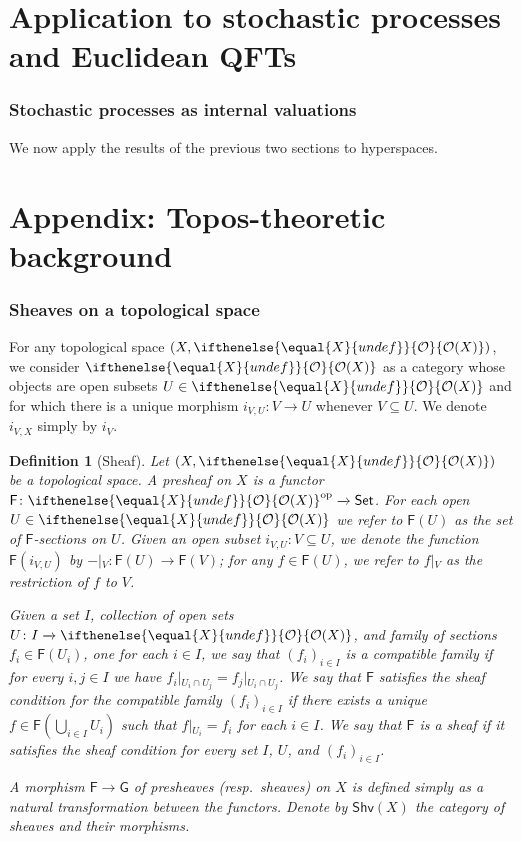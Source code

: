 \documentclass[reqno,11pt]{amsproc}
\theoremstyle{plain}
\newtheorem{definition}[theorem]{Definition}
\theoremstyle{definition}
\newcommand{\cat}[1]{\mathsf{#1}}
\newcommand{\fun}[1]{\mathsf{#1}}
\newcommand{\sheaf}[1]{\fun{#1}}
\newcommand{\op}{^\mathrm{op}}
\newcommand{\Set}{\cat{Set}}
\renewcommand{\to}[1][]{\xrightarrow{#1}}
\newcommand{\shv}{\cat{Shv}}
\newcommand{\Op}[1][undef]{\ifthenelse{\equal{#1}{undef}}{\mathcal{O}}{\mathcal{O}(#1)}}
\newcommand{\rest}[2]{#1\big|\hspace{0in}_{#2}}
\numberwithin{equation}{section}
\begin{document}
\newpage
\part{Application to stochastic processes and Euclidean QFTs}

\section{Stochastic processes as internal valuations}

We now apply the results of the previous two sections to hyperspaces.



\appendix
\part{Appendix: Topos-theoretic background}\label{sec.topos_background}

\section{Sheaves on a topological space}

For any topological space $(X,\Op[X])$, we consider $\Op[X]$ as a category whose objects are open subsets $U\in\Op[X]$ and for which there is a unique morphism $i_{V,U}\colon V\to U$ whenever $V\subseteq U$. We denote $i_{V,X}$ simply by $i_V$.

\begin{definition}[Sheaf]\label{def.sheaf}
Let $(X,\Op[X])$ be a topological space. A \emph{presheaf} on $X$ is a functor $\sheaf{F}\colon\Op[X]\op\to\Set$. For each open $U\in\Op[X]$ we refer to $\sheaf{F}(U)$ as the set of \emph{$\sheaf{F}$-sections on $U$}. Given an open subset $i_{V,U}\colon V\subseteq U$, we denote the function $\sheaf{F}(i_{V,U})$ by $\rest{-}{V}\colon\sheaf{F}(U)\to\sheaf{F}(V)$; for any $f\in\sheaf{F}(U)$, we refer to $\rest{f}{V}$ as the \emph{restriction of $f$ to $V$}.

Given a set $I$, collection of open sets $U\colon I\to\Op[X]$, and family of sections $f_i\in\sheaf{F}(U_i)$, one for each $i\in I$, we say that $(f_i)_{i\in I}$ is a \emph{compatible family} if for every $i,j\in I$ we have $\rest{f_i}{U_i\cap U_j}=\rest{f_j}{U_i\cap U_j}$. We say that $\sheaf{F}$ satisfies the \emph{sheaf condition} for the compatible family $(f_i)_{i\in I}$ if there exists a unique $f\in \sheaf{F}(\bigcup_{i\in I}U_i)$ such that $\rest{f}{U_i}=f_i$ for each $i\in I$. We say that $\sheaf{F}$ is a \emph{sheaf} if it satisfies the sheaf condition for every set $I$, $U$, and $(f_i)_{i\in I}$.

A \emph{morphism $\sheaf{F}\to\sheaf{G}$ of presheaves (resp.\ sheaves) on $X$} is defined simply as a natural transformation between the functors. Denote by $\shv(X)$ the category of sheaves and their morphisms.
\end{definition}
\end{document}

